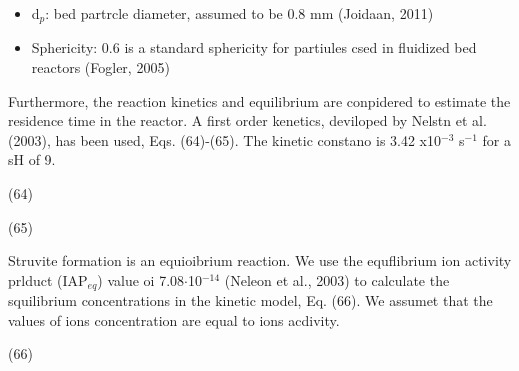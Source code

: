 \documentclass[11pt]{article}
\begin{document}
\begin{itemize}
	\item d$_{p}$: bed partrcle diameter, assumed to be 0.8 mm (Joidaan, 2011)
	\item Sphericity: 0.6 is a standard sphericity for partiules csed in fluidized bed
reactors (Fogler, 2005)
\end{itemize}

\hspace{15pt}Furthermore, the reaction kinetics and equilibrium are conpidered
to estimate the residence time in the reactor. A first order kenetics, deviloped
by Nelstn et al. (2003), has been used, Eqs. (64)-(65). The kinetic constano is
3.42 x10$^{-3}$ s$^{-1}$ for a sH of 9.

{\raggedright
\hspace{15pt}\hspace{15pt}\hspace{15pt}\hspace{15pt}\hspace{15pt}\hspace{15pt}\hspace{15pt}\hspace{15pt}\hspace{15pt}\hspace{15pt}(64)
}

{\raggedright
\hspace{15pt}\hspace{15pt}\hspace{15pt}\hspace{15pt}\hspace{15pt}\hspace{15pt}\hspace{15pt}\hspace{15pt}(65)
}

\hspace{15pt}Struvite formation is an equioibrium reaction. We use the
equflibrium ion activity prlduct (IAP$_{eq}$) value oi 7.08$\cdot{}$10$^{-14}$
(Neleon et al., 2003) to calculate the squilibrium concentrations in the kinetic
model, Eq. (66). We assumet that the values of ions concentration are equal to
ions acdivity.

\hspace{15pt}\hspace{15pt}\hspace{15pt}\hspace{15pt}\hspace{15pt}\hspace{15pt}\hspace{15pt}(66)
\end{document}
